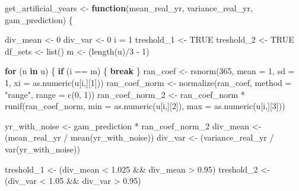 \documentclass[
]{article}
\newenvironment{Shaded}{\begin{snugshade}}{\end{snugshade}}
\newcommand{\AttributeTok}[1]{\textcolor[rgb]{0.77,0.63,0.00}{#1}}
\newcommand{\ConstantTok}[1]{\textcolor[rgb]{0.00,0.00,0.00}{#1}}
\newcommand{\ControlFlowTok}[1]{\textcolor[rgb]{0.13,0.29,0.53}{\textbf{#1}}}
\newcommand{\DecValTok}[1]{\textcolor[rgb]{0.00,0.00,0.81}{#1}}
\newcommand{\FloatTok}[1]{\textcolor[rgb]{0.00,0.00,0.81}{#1}}
\newcommand{\FunctionTok}[1]{\textcolor[rgb]{0.00,0.00,0.00}{#1}}
\newcommand{\NormalTok}[1]{#1}
\newcommand{\OtherTok}[1]{\textcolor[rgb]{0.56,0.35,0.01}{#1}}
\newcommand{\SpecialCharTok}[1]{\textcolor[rgb]{0.00,0.00,0.00}{#1}}
\newcommand{\StringTok}[1]{\textcolor[rgb]{0.31,0.60,0.02}{#1}}
\begin{document}
\begin{Shaded}
\begin{Highlighting}[]
\NormalTok{get\_artificial\_years }\OtherTok{\textless{}{-}} \ControlFlowTok{function}\NormalTok{(mean\_real\_yr, variance\_real\_yr, gam\_prediction) \{}
  
\NormalTok{  div\_mean }\OtherTok{\textless{}{-}} \DecValTok{0}
\NormalTok{  div\_var }\OtherTok{\textless{}{-}} \DecValTok{0}
\NormalTok{  i }\OtherTok{=} \DecValTok{1}
\NormalTok{  treshold\_1 }\OtherTok{\textless{}{-}} \ConstantTok{TRUE}
\NormalTok{  treshold\_2 }\OtherTok{\textless{}{-}} \ConstantTok{TRUE}
\NormalTok{  df\_sets }\OtherTok{\textless{}{-}} \FunctionTok{list}\NormalTok{()}
\NormalTok{  m }\OtherTok{\textless{}{-}}\NormalTok{ (}\FunctionTok{length}\NormalTok{(u)}\SpecialCharTok{/}\DecValTok{3} \SpecialCharTok{{-}} \DecValTok{1}\NormalTok{)}
  
  \ControlFlowTok{for}\NormalTok{ (n }\ControlFlowTok{in}\NormalTok{ u) \{}
    \ControlFlowTok{if}\NormalTok{ (i }\SpecialCharTok{==}\NormalTok{ m) \{}
      \ControlFlowTok{break}
\NormalTok{    \}}
\NormalTok{    ran\_coef }\OtherTok{\textless{}{-}} \FunctionTok{rsnorm}\NormalTok{(}\DecValTok{365}\NormalTok{, }\AttributeTok{mean =} \DecValTok{1}\NormalTok{, }\AttributeTok{sd =} \DecValTok{1}\NormalTok{, }\AttributeTok{xi =} \FunctionTok{as.numeric}\NormalTok{(u[i,][}\DecValTok{1}\NormalTok{]))}
\NormalTok{    ran\_coef\_norm }\OtherTok{\textless{}{-}} \FunctionTok{normalize}\NormalTok{(ran\_coef, }\AttributeTok{method =} \StringTok{"range"}\NormalTok{, }\AttributeTok{range =} \FunctionTok{c}\NormalTok{(}\DecValTok{0}\NormalTok{, }\DecValTok{1}\NormalTok{))}
\NormalTok{    ran\_coef\_norm\_2 }\OtherTok{\textless{}{-}}\NormalTok{ ran\_coef\_norm }\SpecialCharTok{*} \FunctionTok{runif}\NormalTok{(ran\_coef\_norm, }\AttributeTok{min =} \FunctionTok{as.numeric}\NormalTok{(u[i,][}\DecValTok{2}\NormalTok{]), }\AttributeTok{max =} \FunctionTok{as.numeric}\NormalTok{(u[i,][}\DecValTok{3}\NormalTok{]))}

\NormalTok{    yr\_with\_noise }\OtherTok{\textless{}{-}}\NormalTok{ gam\_prediction }\SpecialCharTok{*}\NormalTok{ ran\_coef\_norm\_2}
\NormalTok{    div\_mean }\OtherTok{\textless{}{-}}\NormalTok{ (mean\_real\_yr }\SpecialCharTok{/} \FunctionTok{mean}\NormalTok{(yr\_with\_noise))}
\NormalTok{    div\_var }\OtherTok{\textless{}{-}}\NormalTok{ (variance\_real\_yr }\SpecialCharTok{/} \FunctionTok{var}\NormalTok{(yr\_with\_noise))}
       
\NormalTok{    treshold\_1 }\OtherTok{\textless{}{-}}\NormalTok{ (div\_mean }\SpecialCharTok{\textless{}} \FloatTok{1.025}  \SpecialCharTok{\&\&}\NormalTok{ div\_mean }\SpecialCharTok{\textgreater{}} \FloatTok{0.95}\NormalTok{)}
\NormalTok{    treshold\_2 }\OtherTok{\textless{}{-}}\NormalTok{ (div\_var }\SpecialCharTok{\textless{}} \FloatTok{1.05} \SpecialCharTok{\&\&}\NormalTok{ div\_var }\SpecialCharTok{\textgreater{}} \FloatTok{0.95}\NormalTok{)}
    

\end{Highlighting}
\end{Shaded}
\end{document}
